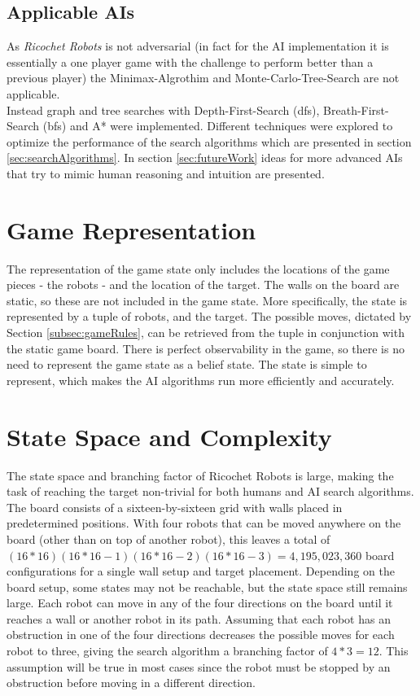 \documentclass[a4paper,10pt]{article}
\begin{document}
  \subsection{Applicable AIs}
  As \textit{Ricochet Robots} is not adversarial (in fact for the AI implementation it is essentially a one player game with the challenge to perform better than a previous player) the Minimax-Algrothim and Monte-Carlo-Tree-Search are not applicable. \\
  Instead graph and tree searches with Depth-First-Search (dfs), Breath-First-Search (bfs) and A* were implemented. Different techniques were explored to optimize the performance of the search algorithms which are presented in section \ref{sec:searchAlgorithms}. In section \ref{sec:futureWork} ideas for more advanced AIs that try to mimic human reasoning and intuition are presented.

\section{Game Representation}
\label{sec:gameRep}
The representation of the game state only includes the locations of the game pieces - the robots - and the location of the target. The walls on the board are static,
so these are not included in the game state. More specifically, the state is represented by a tuple of robots, and the target. The possible moves, dictated by Section
\ref{subsec:gameRules}, can be retrieved from the tuple in conjunction with the static game board. There is perfect observability in the game, so there is no need to represent
the game state as a belief state. The state is simple to represent, which makes the AI algorithms run more efficiently and accurately.


\section{State Space and Complexity}
\label{sec:stateSpace}
The state space and branching factor of Ricochet Robots is large, making the task of reaching the target non-trivial for both humans and AI search algorithms.
The board consists of a sixteen-by-sixteen grid with walls placed in predetermined positions.  With four robots that can be moved anywhere on the board (other
than on top of another robot), this leaves a total of $(16*16)(16*16-1)(16*16-2)(16*16-3) = 4,195,023,360$ board configurations for a single wall setup and
target placement.  Depending on the board setup, some states may not be reachable, but the state space still remains large. Each robot can move in any of the
four directions on the board until it reaches a wall or another robot in its path.  Assuming that each robot has an obstruction in one of the four directions
decreases the possible moves for each robot to three, giving the search algorithm a branching factor of $4*3 = 12$.  This assumption will be true in most cases since
the robot must be stopped by an obstruction before moving in a different direction. \\
\end{document}
